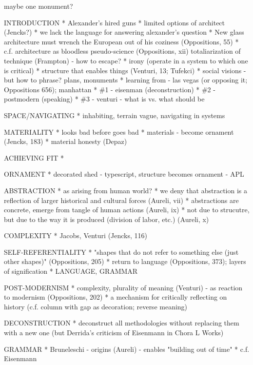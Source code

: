 maybe one monument?

INTRODUCTION
* Alexander's hired guns
* limited options of architect (Jencks?)
* we lack the language for answering alexander's question
* New glass architecture must wrench the European out of his coziness (Oppositions, 55)
* c.f. architecture as bloodless pseudo-science (Oppositions, xii)
  totaliarization of technique (Frampton) - how to escape?
* irony (operate in a system to which one is critical)
* structure that enables things (Venturi, 13; Tufekci)
* social visions - but how to phrase? plans, monuments
* learning from - las vegas (or opposing it; Oppositions 656); manhattan
* \#1 - eisenman (deconstruction)
* \#2 - postmodern (speaking)
* \#3 - venturi - what is vs. what should be



SPACE/NAVIGATING
* inhabiting, terrain vague, navigating in systems

MATERIALITY
* looks bad before goes bad
* materials - become ornament (Jencks, 183)
* material honesty (Depaz)

ACHIEVING FIT
*

ORNAMENT
* decorated shed - typescript, structure becomes ornament - APL

ABSTRACTION
* as arising from human world?
* we deny that abstraction is a reflection of larger historical and cultural forces (Aureli, vii)
* abstractions are concrete, emerge from tangle of human actions (Aureli, ix)
* not due to strucutre, but due to the way it is produced (division of labor, etc.) (Aureli, x)

COMPLEXITY
* Jacobs, Venturi (Jencks, 116)

SELF-REFERENTIALITY
* "shapes that do not refer to something else (just other shapes)" (Oppositions, 205)
* return to language (Oppositions, 373); layers of signification
* LANGUAGE, GRAMMAR

POST-MODERNISM
* complexity, plurality of meaning (Venturi) - as reaction to modernism (Oppositions, 202)
* a mechanism for critically reflecting on history
  (c.f. column with gap as decoration; reverse meaning)

DECONSTRUCTION
* deconstruct all methodologies without replacing them with a new one
  (but Derrida's criticism of Eisenmann in Chora L Works)

GRAMMAR
* Bruneleschi - origins (Aureli) - enables "building out of time"
* c.f. Eisenmann

